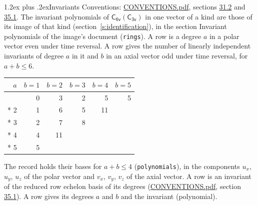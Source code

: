 \documentclass[10pt,a4paper]{article}
\makeatletter
\renewcommand\section{\@startsection{section}{1}{\z@}{-3ex plus -1ex minus -.2ex}%
  {1.2ex plus .2ex}{\normalfont\large\sffamily\bfseries\color{parttitle}}}
\numberwithin{equation}{section}
\newcommand{\grp}[1]{\mathsf{#1}}
\makeatother
\begin{document}
\section{Invariants}\label{s:invariants}
Conventions: \href{../../CONVENTIONS.pdf}{CONVENTIONS.pdf}, sections \href{../../CONVENTIONS.pdf\#conv.31.2}{31.2} and \href{../../CONVENTIONS.pdf\#conv.35.1}{35.1}.
The invariant polynomials of $\grp{C_{6v}}(\grp{C_{3v}})$ in one vector of a kind are those of its image of that kind (section~\ref{s:identification}), in the section Invariant polynomials of the image's document (\texttt{rings}).
\leavevmode\label{n:index.degree.polar}\label{n:index.degree.axial}A row is a degree $a$ in a polar vector even under time reversal. A row gives the number of linearly independent invariants of degree $a$ in it and $b$ in an axial vector odd under time reversal, for $a + b \le 6$.
{\small\begin{longtable}{@{}rrrrrr@{}}\toprule
$a$ & $b = 1$ & $b = 2$ & $b = 3$ & $b = 4$ & $b = 5$\\\midrule\endhead
\bottomrule\endfoot\endlastfoot
1 & 0 & 3 & 2 & 5 & 5\\*
2 & 1 & 6 & 5 & 11 & \\*
3 & 2 & 7 & 8 &  & \\*
4 & 4 & 11 &  &  & \\*
5 & 5 &  &  &  & \\
\bottomrule\end{longtable}}
\leavevmode\label{n:local.component.polar}\label{n:local.component.axial}The record holds their bases for $a + b \le 4$ (\texttt{polynomials}), in the components $u_{x}$, $u_{y}$, $u_{z}$ of the polar vector and $v_{x}$, $v_{y}$, $v_{z}$ of the axial vector. \label{n:head.polynomial}A row is an invariant of the reduced row echelon basis of its degrees (\href{../../CONVENTIONS.pdf}{CONVENTIONS.pdf}, section \href{../../CONVENTIONS.pdf\#conv.35.1}{35.1}). A row gives its degrees $a$ and $b$ and the invariant (polynomial).
\end{document}
